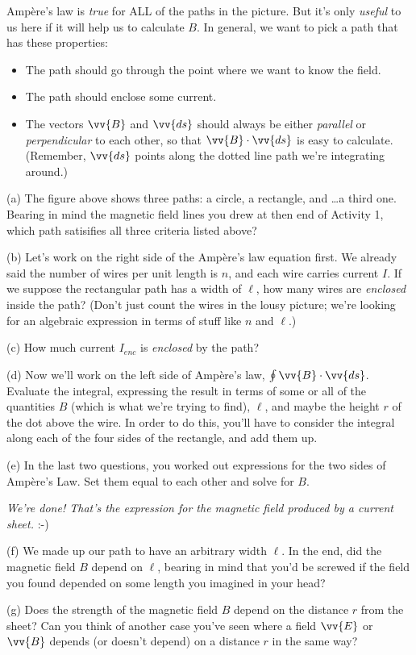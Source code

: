 Amp\`ere's law is \textit{true} for ALL of the paths in the picture.  But it's only \textit{useful} to us here if it will help us to calculate $B$.  In general, we want to pick a path that has these properties:
\begin{itemize}[nosep]
\item The path should go through the point where we want to know the field.
\item The path should enclose some current.
\item The vectors $\vv{B}$ and $\vv{ds}$ should always be either \textit{parallel} or \textit{perpendicular} to each other, so that $\vv{B}\cdot \vv{ds}$ is easy to calculate.  (Remember, $\vv{ds}$ points along the dotted line path we're integrating around.)
\end{itemize}

(a) The figure above shows three paths: a circle, a rectangle, and \ldots a third one.  Bearing in mind the magnetic field lines you drew at then end of Activity 1, which path satisifies all three criteria listed above?
\answerspace{0.3in}

\pagebreak[3]
(b) Let's work on the right side of the Amp\`ere's law equation first.  We already said the number of wires per unit length is $n$, and each wire carries current $I$.  If we suppose the rectangular path has a width of $\ell$, how many wires are \textit{enclosed} inside the path?  (Don't just count the wires in the lousy picture; we're looking for 
an algebraic expression in terms of stuff like $n$ and $\ell$.)
\answerspace{0.3in}

(c) How much current $I_{enc}$ is \textit{enclosed} by the path?
\answerspace{0.5in}

(d) Now we'll work on the left side of Amp\`ere's law, $\oint \vv {B}\cdot \vv{ds}$.  Evaluate the integral, 
expressing the result in terms of some
or all of the quantities $B$ (which is what we're trying
to find), $\ell$, and maybe the height $r$ of the dot above the wire.  In order to do this, you'll have to consider
the integral along each of the four sides of the rectangle,
and add them up.
\answerspace{1.3in}

(e) In the last two questions, you worked out expressions
for the two sides of Amp\`ere's Law. Set them equal to each other
and solve for $B$.
\answerspace{1in}

\centerline{\textit{We're done! That's the expression for the magnetic field produced 
by a current sheet.}  :-)}

(f) We made up our path to have an arbitrary width $\ell$.  In the end, did the magnetic field $B$ depend on $\ell$, bearing in mind that you'd be screwed if the field you found depended on some length you imagined in your head?
\answerspace{0.4in}

(g) Does the strength of the magnetic field $B$ depend on the
distance $r$ from the sheet?  Can you think of another case you've seen where a field $\vv{E}$ or $\vv{B}$ depends (or doesn't depend) on a distance $r$ in the same way?
\answerspace{0.4in}
